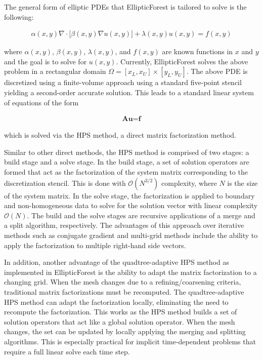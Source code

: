 The general form of elliptic PDEs that EllipticForest is tailored to solve is the following:

\begin{align}
\alpha(x,y) \nabla \cdot \Big[ \beta(x,y) \nabla u(x,y) \Big] + \lambda(x,y) u(x,y) = f(x,y)
\end{align}

where $\alpha(x,y)$, $\beta(x,y)$, $\lambda(x,y)$, and $f(x,y)$ are known functions in $x$ and $y$ and the goal is to solve for $u(x,y)$. Currently, EllipticForest solves the above problem in a rectangular domain $\Omega = [x_L, x_U] \times [y_L, y_U]$. The above PDE is discretized using a finite-volume approach using a standard five-point stencil yielding a second-order accurate solution. This leads to a standard linear system of equations of the form

\begin{align}
\textbf{A} \textbf{u} = \textbf{f}
\end{align}

which is solved via the HPS method, a direct matrix factorization method.

Similar to other direct methods, the HPS method is comprised of two stages: a build stage and a solve stage. In the build stage, a set of solution operators are formed that act as the factorization of the system matrix corresponding to the discretization stencil. This is done with $\mathcal{O}(N^{3/2})$ complexity, where $N$ is the size of the system matrix. In the solve stage, the factorization is applied to boundary and non-homogeneous data to solve for the solution vector with linear complexity $\mathcal{O}(N)$. The build and the solve stages are recursive applications of a merge and a split algorithm, respectively. The advantages of this approach over iterative methods such as conjugate gradient and multi-grid methods include the ability to apply the factorization to multiple right-hand side vectors.

In addition, another advantage of the quadtree-adaptive HPS method as implemented in EllipticForest is the ability to adapt the matrix factorization to a changing grid. When the mesh changes due to a refining/coarsening criteria, traditional matrix factorizations must be recomputed. The quadtree-adaptive HPS method can adapt the factorization locally, eliminating the need to recompute the factorization. This works as the HPS method builds a set of solution operators that act like a global solution operator. When the mesh changes, the set can be updated by locally applying the merging and splitting algorithms. This is especially practical for implicit time-dependent problems that require a full linear solve each time step.

